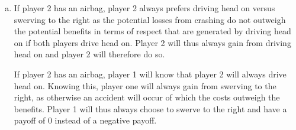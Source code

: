 \documentclass[a4paper]{article}
\begin{document}
\begin{enumerate}[(a)]
\begin{itemize}
$$(D, C),(C,D) $$ 

Checking for a mixed strategy equilibrium:

$$u_1(C)=0$$
$$u_1(D,\sigma_2)=\sigma_{2C}\cdot R+(1-\sigma_{2C})\cdot\left(\dfrac{R}{2}-k_H\right)$$
$$u_1(C)=u_1(D,\sigma_2) \iff \sigma_{2C}=\dfrac{2k_H-R}{2k_H+R}$$

Similarly for player 2:
$$u_2(C)=u_2(\sigma_1,D) \iff \sigma_{1C}=\dfrac{2k_H-R}{2k_H+R}$$

Thus there is one mixed strategy nash equilibruim:

$$(\sigma_{1C},\sigma_{1D}),(\sigma_{2C},\sigma_{2D})=\left(\dfrac{2k_H-R}{2k_H+R},\dfrac{2R}{2k_H+R}\right),\left(\dfrac{2k_H-R}{2k_H+R},\dfrac{2R}{2k_H+R}\right)$$

\item If $k_2=k_L$,\\

We can see that for player 2, the strategy $C$ is strictly dominated by $D$. The following payoff matrix remains after deleting strategy $C$ for player 2. 

{\renewcommand{\arraystretch}{2}
\begin{tabular}{cc|c|}
      & \multicolumn{1}{c}{} & \multicolumn{1}{c}{Player $2$}\\
      & \multicolumn{1}{c}{} & \multicolumn{1}{c}{$C$}   \\\cline{3-3}
      \multirow{2}*{Player $1$}  & $C$ & $0,R$ \\\cline{3-3}
      & $D$  & $\dfrac{R}{2}-k_H,\dfrac{R}{2}-k_L$ \\\cline{3-3}
\end{tabular}
}

We can now see that for player 1 in this matrix, strategy $D$ is strictly dominated by strategy $C$.\\

This means that there is only one unique pure strategy Nash equilibrium:
$$(C,D)$$ 

And there are no mixed strategy Nash equilibria.
\end{itemize}
\item
If player 2 has an airbag, player 2 always prefers driving head on versus swerving to the right as the potential losses from crashing do not outweigh the potential benefits in terms of respect that are generated by driving head on if both players drive head on.  Player 2 will thus always gain from driving head on and player 2 will therefore do so.

If player 2 has an airbag, player 1 will know that player 2 will always drive head on. Knowing this, player one will always gain from swerving to the right, as otherwise an accident will occur of which the costs outweigh the benefits. Player 1 will thus always choose to swerve to the right and have a payoff of 0 instead of a negative payoff.


\end{enumerate}
\end{document}
